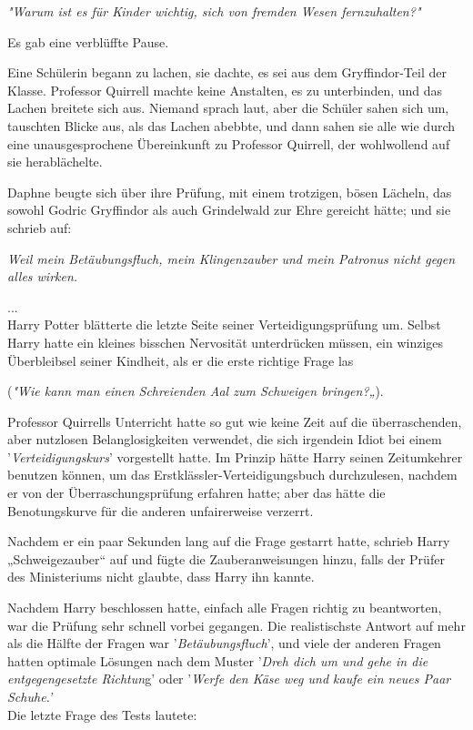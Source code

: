 {\emph{"Warum ist es für Kinder wichtig, sich von fremden Wesen fernzuhalten?"}

Es gab eine verblüffte Pause.

Eine Schülerin begann zu lachen, sie dachte, es sei aus dem Gryffindor-Teil der Klasse. Professor Quirrell machte keine Anstalten, es zu unterbinden, und das Lachen breitete sich aus. Niemand sprach laut, aber die Schüler sahen sich um, tauschten Blicke aus, als das Lachen abebbte, und dann sahen sie alle wie durch eine unausgesprochene Übereinkunft zu Professor Quirrell, der wohlwollend auf sie herablächelte.

Daphne beugte sich über ihre Prüfung, mit einem trotzigen, bösen Lächeln, das sowohl Godric Gryffindor als auch Grindelwald zur Ehre gereicht hätte; und sie schrieb auf:

\emph{Weil mein Betäubungsfluch, mein Klingenzauber und mein Patronus nicht gegen alles wirken.}

\hfill\break ...\\ Harry Potter blätterte die letzte Seite seiner Verteidigungsprüfung um. Selbst Harry hatte ein kleines bisschen Nervosität unterdrücken müssen, ein winziges Überbleibsel seiner Kindheit, als er die erste richtige Frage las

(\emph{"Wie kann man einen Schreienden Aal zum Schweigen bringen?„}).

Professor Quirrells Unterricht hatte so gut wie keine Zeit auf die überraschenden, aber nutzlosen Belanglosigkeiten verwendet, die sich irgendein Idiot bei einem '\emph{Verteidigungskurs}' vorgestellt hatte. Im Prinzip hätte Harry seinen Zeitumkehrer benutzen können, um das Erstklässler-Verteidigungsbuch durchzulesen, nachdem er von der Überraschungsprüfung erfahren hatte; aber das hätte die Benotungskurve für die anderen unfairerweise verzerrt.

Nachdem er ein paar Sekunden lang auf die Frage gestarrt hatte, schrieb Harry „Schweigezauber“ auf und fügte die Zauberanweisungen hinzu, falls der Prüfer des Ministeriums nicht glaubte, dass Harry ihn kannte.

Nachdem Harry beschlossen hatte, einfach alle Fragen richtig zu beantworten, war die Prüfung sehr schnell vorbei gegangen. Die realistischste Antwort auf mehr als die Hälfte der Fragen war '\emph{Betäubungsfluch}', und viele der anderen Fragen hatten optimale Lösungen nach dem Muster '\emph{Dreh dich um und gehe in die entgegengesetzte Richtun}g' oder '\emph{Werfe den Käse weg und kaufe ein neues Paar Schuhe.'}\\ Die letzte Frage des Tests lautete:

}
